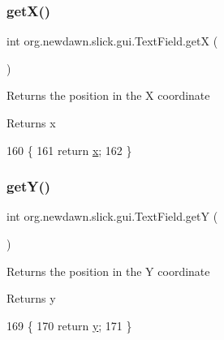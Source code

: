 \subsubsection{\texorpdfstring{get\+X()}{getX()}}
{\footnotesize\ttfamily int org.\+newdawn.\+slick.\+gui.\+Text\+Field.\+getX (\begin{DoxyParamCaption}{ }\end{DoxyParamCaption})\hspace{0.3cm}{\ttfamily [inline]}}

Returns the position in the X coordinate

\begin{DoxyReturn}{Returns}
x 
\end{DoxyReturn}

\begin{DoxyCode}
160                       \{
161         \textcolor{keywordflow}{return} \mbox{\hyperlink{classorg_1_1newdawn_1_1slick_1_1gui_1_1_text_field_a05dd91af6b1552f194c1aadbdf894c8c}{x}};
162     \}
\end{DoxyCode}
\mbox{\label{classorg_1_1newdawn_1_1slick_1_1gui_1_1_text_field_ab9ad1b3f4528289832bca8b3a27c0f60}} 
\subsubsection{\texorpdfstring{get\+Y()}{getY()}}
{\footnotesize\ttfamily int org.\+newdawn.\+slick.\+gui.\+Text\+Field.\+getY (\begin{DoxyParamCaption}{ }\end{DoxyParamCaption})\hspace{0.3cm}{\ttfamily [inline]}}

Returns the position in the Y coordinate

\begin{DoxyReturn}{Returns}
y 
\end{DoxyReturn}

\begin{DoxyCode}
169                       \{
170         \textcolor{keywordflow}{return} \mbox{\hyperlink{classorg_1_1newdawn_1_1slick_1_1gui_1_1_text_field_acb0df9f048eabd20f6d5d40799b48706}{y}};
171     \}
\end{DoxyCode}
\mbox{\label{classorg_1_1newdawn_1_1slick_1_1gui_1_1_text_field_abe8804392248db859a452f8bbf0955a1}} 
